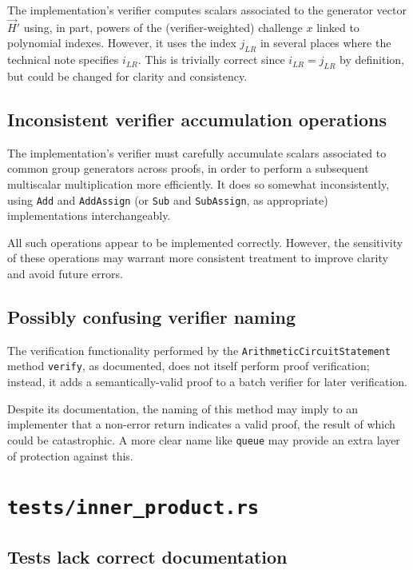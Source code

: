 \documentclass{article}
\begin{document}
The implementation's verifier computes scalars associated to the generator vector $\vec{H}'$ using, in part, powers of the (verifier-weighted) challenge $x$ linked to polynomial indexes.
However, it uses the index $j_{LR}$ in several places where the technical note specifies $i_{LR}$.
This is trivially correct since $i_{LR} = j_{LR}$ by definition, but could be changed for clarity and consistency.


\subsection{Inconsistent verifier accumulation operations}

The implementation's verifier must carefully accumulate scalars associated to common group generators across proofs, in order to perform a subsequent multiscalar multiplication more efficiently. It does so somewhat inconsistently, using \texttt{Add} and \texttt{AddAssign} (or \texttt{Sub} and \texttt{SubAssign}, as appropriate) implementations interchangeably.

All such operations appear to be implemented correctly.
However, the sensitivity of these operations may warrant more consistent treatment to improve clarity and avoid future errors.


\subsection{Possibly confusing verifier naming}

The verification functionality performed by the \texttt{ArithmeticCircuitStatement} method \texttt{verify}, as documented, does not itself perform proof verification; instead, it adds a semantically-valid proof to a batch verifier for later verification.

Despite its documentation, the naming of this method may imply to an implementer that a non-error return indicates a valid proof, the result of which could be catastrophic.
A more clear name like \texttt{queue} may provide an extra layer of protection against this.


\section{\texttt{tests/inner\_product.rs}}

\subsection{Tests lack correct documentation}
\end{document}
